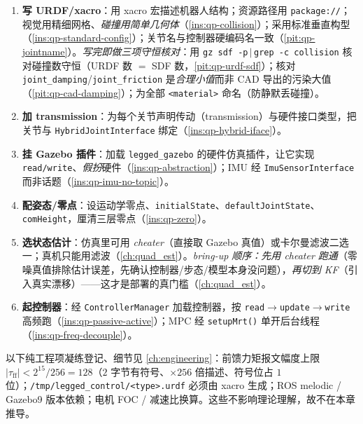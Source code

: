 \begin{enumerate}
  \item \textbf{写 URDF/xacro}：用 xacro 宏描述机器人结构；资源路径用 \texttt{package://}；视觉用精细网格、\emph{碰撞用简单几何体}（\cref{ins:qp-collision}）；采用标准垂直构型（\cref{ins:qp-standard-config}）；关节名与控制器硬编码名一致（\cref{pit:qp-jointname}）。\emph{写完即做三项守恒核对}：用 \texttt{gz sdf -p}$\,|\,$\texttt{grep -c collision} 核对碰撞数守恒（URDF 数 $=$ SDF 数，\cref{pit:qp-urdf-sdf}）；核对 \texttt{joint\_damping}/\allowbreak\texttt{joint\_friction} 是\emph{合理小值}而非 CAD 导出的污染大值（\cref{pit:qp-cad-damping}）；为全部 \texttt{<material>} 命名（防静默丢碰撞）。
  \item \textbf{加 transmission}：为每个关节声明传动（transmission）与硬件接口类型，把关节与 \texttt{HybridJointInterface} 绑定（\cref{ins:qp-hybrid-iface}）。
  \item \textbf{挂 Gazebo 插件}：加载 \texttt{legged\_gazebo} 的硬件仿真插件，让它实现 \texttt{read/write}、\emph{假扮}硬件（\cref{ins:qp-abstraction}）；IMU 经 \texttt{ImuSensorInterface} 而非话题（\cref{ins:qp-imu-no-topic}）。
  \item \textbf{配姿态/零点}：设运动学零点、\texttt{initialState}、\texttt{defaultJointState}、\texttt{comHeight}，厘清三层零点（\cref{ins:qp-zero}）。
  \item \textbf{选状态估计}：仿真里可用 \emph{cheater}（直接取 Gazebo 真值）或卡尔曼滤波二选一；真机只能用滤波（\cref{ch:quad_est}）\cite{sleiman2021unified}。\emph{bring-up 顺序：先用 cheater 跑通}（零噪真值排除估计误差，先确认控制器/步态/模型本身没问题），\emph{再切到 KF}（引入真实漂移）——这才是部署的真门槛（\cref{ch:quad_est}）。
  \item \textbf{起控制器}：经 \texttt{ControllerManager} 加载控制器，按 \texttt{read}$\to$\texttt{update}$\to$\texttt{write} 高频跑（\cref{ins:qp-passive-active}）；MPC 经 \texttt{setupMrt()} 单开后台线程（\cref{ins:qp-freq-decouple}）。
\end{enumerate}

\begin{note}\label{note:qp-eng}
以下纯工程项凝练登记、细节见 \cref{ch:engineering}：前馈力矩报文幅度上限 $|\tau_{\mathrm{ff}}|<2^{15}/256=128$（$2$ 字节有符号、$\times256$ 倍描述、符号位占 $1$ 位）\cite{unitree2023quadruped}；\texttt{/\allowbreak tmp/\allowbreak legged\_control/\allowbreak <type>.\allowbreak urdf} 必须由 xacro 生成；ROS melodic / Gazebo9 版本依赖；电机 FOC / 减速比换算。这些不影响理论理解，故不在本章推导。
\end{note}

